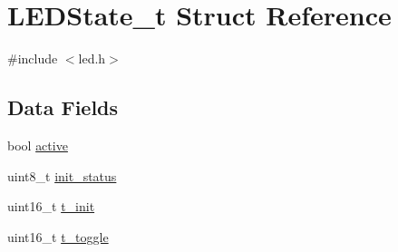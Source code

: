 \hypertarget{structLEDState__t}{\section{L\-E\-D\-State\-\_\-t Struct Reference}
\label{structLEDState__t}
}


{\ttfamily \#include $<$led.\-h$>$}

\subsection*{Data Fields}
\begin{DoxyCompactItemize}
\item 
bool \hyperlink{structLEDState__t_a4dfa4c1e6cd639eb91ad48d7c877d1ea}{active}
\item 
uint8\-\_\-t \hyperlink{structLEDState__t_a447f02dbcc11821ccd1b25f9fb6aaf43}{init\-\_\-status}
\item 
uint16\-\_\-t \hyperlink{structLEDState__t_a8ef9c73d79bf547466153ab408d762c4}{t\-\_\-init}
\item 
uint16\-\_\-t \hyperlink{structLEDState__t_af8eb5cb09efdf634498a0078b263d620}{t\-\_\-toggle}
\end{DoxyCompactItemize}



